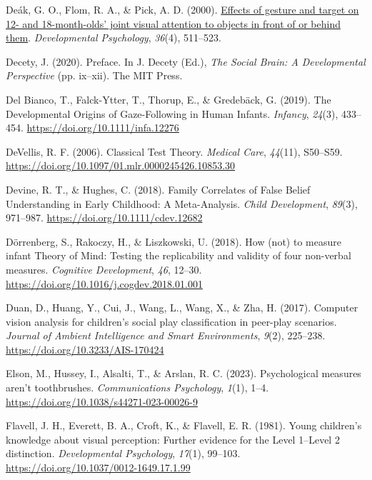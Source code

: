 \documentclass[
]{scrbook}
\newlength{\cslhangindent}
\newenvironment{CSLReferences}[2] %
 {\begin{list}{}{%
  \setlength{\itemindent}{0pt}
  \setlength{\leftmargin}{0pt}
  \setlength{\parsep}{0pt}
  \ifodd #1
   \setlength{\leftmargin}{\cslhangindent}
   \setlength{\itemindent}{-1\cslhangindent}
  \fi
  \setlength{\itemsep}{#2\baselineskip}}}
 {\end{list}}
\begin{document}
\begin{CSLReferences}{1}{0}
Deák, G. O., Flom, R. A., \& Pick, A. D. (2000). \href{https://www.ncbi.nlm.nih.gov/pubmed/10902702}{Effects of gesture and target on 12- and 18-month-olds' joint visual attention to objects in front of or behind them}. \emph{Developmental Psychology}, \emph{36}(4), 511--523.

Decety, J. (2020). Preface. In J. Decety (Ed.), \emph{The {Social Brain}: {A Developmental Perspective}} (pp. ix--xii). The MIT Press.

Del Bianco, T., Falck-Ytter, T., Thorup, E., \& Gredebäck, G. (2019). The {Developmental Origins} of {Gaze-Following} in {Human Infants}. \emph{Infancy}, \emph{24}(3), 433--454. \url{https://doi.org/10.1111/infa.12276}

DeVellis, R. F. (2006). Classical {Test Theory}. \emph{Medical Care}, \emph{44}(11), S50--S59. \url{https://doi.org/10.1097/01.mlr.0000245426.10853.30}

Devine, R. T., \& Hughes, C. (2018). Family {Correlates} of {False Belief Understanding} in {Early Childhood}: {A Meta-Analysis}. \emph{Child Development}, \emph{89}(3), 971--987. \url{https://doi.org/10.1111/cdev.12682}

Dörrenberg, S., Rakoczy, H., \& Liszkowski, U. (2018). How (not) to measure infant {Theory} of {Mind}: {Testing} the replicability and validity of four non-verbal measures. \emph{Cognitive Development}, \emph{46}, 12--30. \url{https://doi.org/10.1016/j.cogdev.2018.01.001}

Duan, D., Huang, Y., Cui, J., Wang, L., Wang, X., \& Zha, H. (2017). Computer vision analysis for children's social play classification in peer-play scenarios. \emph{Journal of Ambient Intelligence and Smart Environments}, \emph{9}(2), 225--238. \url{https://doi.org/10.3233/AIS-170424}

Elson, M., Hussey, I., Alsalti, T., \& Arslan, R. C. (2023). Psychological measures aren't toothbrushes. \emph{Communications Psychology}, \emph{1}(1), 1--4. \url{https://doi.org/10.1038/s44271-023-00026-9}

Flavell, J. H., Everett, B. A., Croft, K., \& Flavell, E. R. (1981). Young children's knowledge about visual perception: {Further} evidence for the {Level} 1--{Level} 2 distinction. \emph{Developmental Psychology}, \emph{17}(1), 99--103. \url{https://doi.org/10.1037/0012-1649.17.1.99}


\end{CSLReferences}
\end{document}
